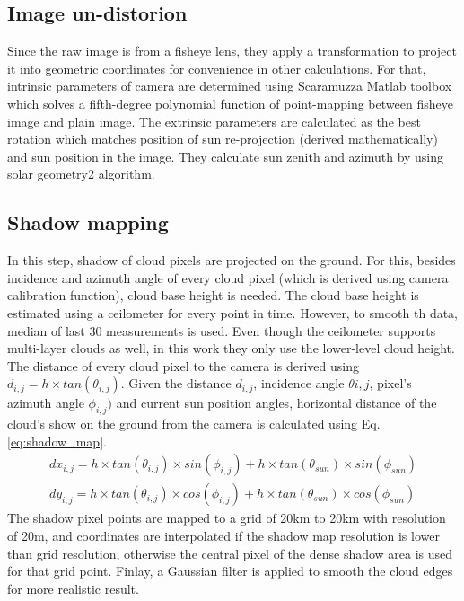 \subsection{Image un-distorion}
Since the raw image is from a fisheye lens, they apply a transformation to project it into geometric coordinates for convenience in other calculations. For that, intrinsic parameters of camera are determined using Scaramuzza Matlab toolbox \cite{fisheye_undistort} which solves a fifth-degree polynomial function of point-mapping between fisheye image and plain image. The extrinsic parameters are calculated as the best rotation which matches position of sun re-projection (derived mathematically) and sun position in the image. They calculate sun zenith and azimuth by using solar geometry2 algorithm\cite{sun_pos1}.

\subsection{Shadow mapping}
In this step, shadow of cloud pixels are projected on the ground. For this, besides incidence and azimuth angle of every cloud pixel (which is derived using camera calibration function), cloud base height is needed. The cloud base height is estimated using a ceilometer for every point in time. However, to smooth th data, median of last 30 measurements is used. Even though the ceilometer supports multi-layer clouds as well, in this work they only use the lower-level cloud height. The distance of every cloud pixel to the camera is derived using $d_{i,j} = h \times tan(\theta_{i,j})$. Given the distance $d_{i,j}$, incidence angle $\theta{i,j}$, pixel's azimuth angle $\phi_{i,j})$ and current sun position angles, horizontal distance of the cloud's show on the ground from the camera is calculated using Eq. \ref{eq:shadow_map}.
\begin{equation}
\label{eq:shadow_map}
\begin{split}
dx_{i,j} = h \times tan(\theta_{i,j}) \times sin(\phi_{i,j}) + h \times  tan(\theta_{sun}) \times sin(\phi_{sun}) \\
dy_{i,j} = h \times tan(\theta_{i,j}) \times cos(\phi_{i,j}) + h \times  tan(\theta_{sun}) \times cos(\phi_{sun})
\end{split}
\end{equation}
The shadow pixel points are mapped to a grid of 20km to 20km with resolution of 20m, and coordinates are interpolated if the shadow map resolution is lower than grid resolution, otherwise the central pixel of the dense shadow area is used for that grid point. Finlay, a Gaussian filter is applied to smooth the cloud edges for more realistic result.

